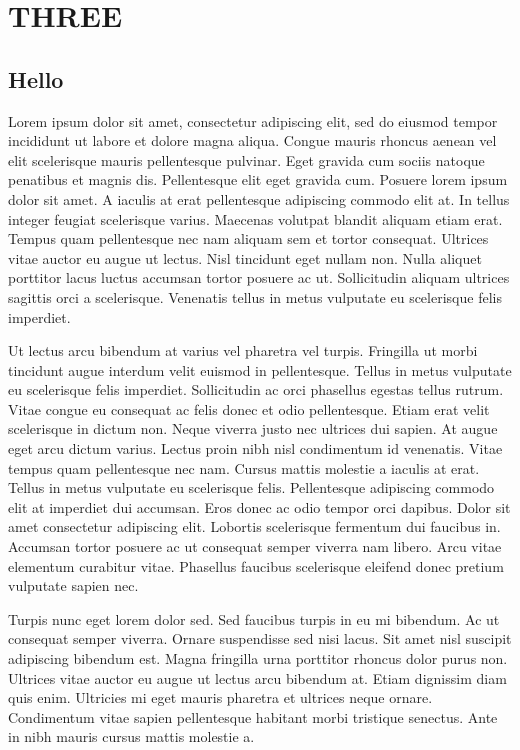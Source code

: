\documentclass[../main.tex]{subfile}
\begin{document}
\chapter{THREE}
\section{Hello}
Lorem ipsum dolor sit amet, consectetur adipiscing elit, sed do eiusmod tempor incididunt ut labore et dolore magna aliqua. Congue mauris rhoncus aenean vel elit scelerisque mauris pellentesque pulvinar. Eget gravida cum sociis natoque penatibus et magnis dis. Pellentesque elit eget gravida cum. Posuere lorem ipsum dolor sit amet. A iaculis at erat pellentesque adipiscing commodo elit at. In tellus integer feugiat scelerisque varius. Maecenas volutpat blandit aliquam etiam erat. Tempus quam pellentesque nec nam aliquam sem et tortor consequat. Ultrices vitae auctor eu augue ut lectus. Nisl tincidunt eget nullam non. Nulla aliquet porttitor lacus luctus accumsan tortor posuere ac ut. Sollicitudin aliquam ultrices sagittis orci a scelerisque. Venenatis tellus in metus vulputate eu scelerisque felis imperdiet.

Ut lectus arcu bibendum at varius vel pharetra vel turpis. Fringilla ut morbi tincidunt augue interdum velit euismod in pellentesque. Tellus in metus vulputate eu scelerisque felis imperdiet. Sollicitudin ac orci phasellus egestas tellus rutrum. Vitae congue eu consequat ac felis donec et odio pellentesque. Etiam erat velit scelerisque in dictum non. Neque viverra justo nec ultrices dui sapien. At augue eget arcu dictum varius. Lectus proin nibh nisl condimentum id venenatis. Vitae tempus quam pellentesque nec nam. Cursus mattis molestie a iaculis at erat. Tellus in metus vulputate eu scelerisque felis. Pellentesque adipiscing commodo elit at imperdiet dui accumsan. Eros donec ac odio tempor orci dapibus. Dolor sit amet consectetur adipiscing elit. Lobortis scelerisque fermentum dui faucibus in. Accumsan tortor posuere ac ut consequat semper viverra nam libero. Arcu vitae elementum curabitur vitae. Phasellus faucibus scelerisque eleifend donec pretium vulputate sapien nec.

Turpis nunc eget lorem dolor sed. Sed faucibus turpis in eu mi bibendum. Ac ut consequat semper viverra. Ornare suspendisse sed nisi lacus. Sit amet nisl suscipit adipiscing bibendum est. Magna fringilla urna porttitor rhoncus dolor purus non. Ultrices vitae auctor eu augue ut lectus arcu bibendum at. Etiam dignissim diam quis enim. Ultricies mi eget mauris pharetra et ultrices neque ornare. Condimentum vitae sapien pellentesque habitant morbi tristique senectus. Ante in nibh mauris cursus mattis molestie a.
\end{document}
